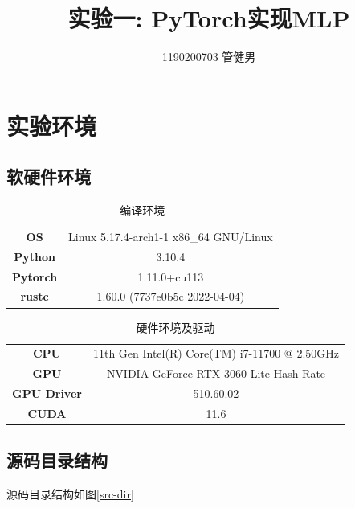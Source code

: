 \documentclass{article}
\title{实验一: PyTorch实现MLP}
\author{1190200703 管健男}
\date{}
\begin{document}
\maketitle


\section{实验环境}

\subsection{软硬件环境}

\begin{table}[h]
    \centering
    \begin{tabular}{|c|c|}
        \hline
        \textbf{OS}      & Linux 5.17.4-arch1-1 x86\_64 GNU/Linux \\
        \textbf{Python}  & 3.10.4                                 \\
        \textbf{Pytorch} & 1.11.0+cu113                           \\
        \textbf{rustc}   & 1.60.0 (7737e0b5c 2022-04-04)          \\
        \hline
    \end{tabular}
    \caption{编译环境}
\end{table}

\begin{table}[h]
    \centering
    \begin{tabular}{|c|c|}
        \hline
        \textbf{CPU}        & 11th Gen Intel(R) Core(TM) i7-11700 @ 2.50GHz \\
        \textbf{GPU}        & NVIDIA GeForce RTX 3060 Lite Hash Rate        \\
        \textbf{GPU Driver} & 510.60.02                                     \\
        \textbf{CUDA}       & 11.6                                          \\
        \hline
    \end{tabular}
    \caption{硬件环境及驱动}
\end{table}

\subsection{源码目录结构}

源码目录结构如图\ref{src-dir}
\end{document}
